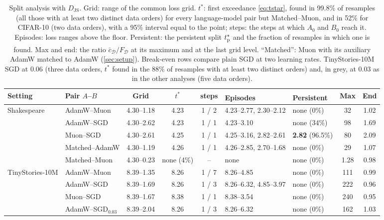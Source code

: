 \documentclass[10pt]{article}
\newcommand{\extra}{\textsuperscript{\dag}}  %
\newcommand{\JS}{\mathrm{JS}}
\newcommand{\cD}{\mathcal{D}}
\begin{document}
\begin{table}[t]
\centering\small
\caption{Split analysis with $D_\JS$. Grid: range of the common loss grid. $t^\ast$: first exceedance
\eqref{eq:tstar}, found in 99.8\% of resamples (all those with at least two distinct data orders)
for every language-model pair but Matched--Muon, and in 52\% for CIFAR-10 (two data orders), with a 95\% interval equal to the point;
steps: the steps at which $A_0$ and $B_0$ reach it. Episodes: loss ranges above the floor. Persistent: the
persistent split $t^\ast_{\rm p}$ and the fraction of resamples in which one is found. Max and end: the ratio
$\bar c_\cD/F_\cD$ at its maximum and at the last grid level. ``Matched''\extra: Muon with its auxiliary AdamW
matched to AdamW (\cref{sec:setup}). Break-even rows compare plain SGD at two learning rates. TinyStories-10M
SGD at 0.06 (three data orders, $t^\ast$ found in the 88\% of resamples with at least two distinct orders) and, in
grey, at 0.03 as in the other analyses (five data orders).}
\label{tab:tstar}
\setlength{\tabcolsep}{2.9pt}
\begin{tabular}{@{}llcccllcc@{}}
\toprule
Setting & Pair $A$--$B$ & Grid & $t^\ast$ & steps & Episodes\extra & Persistent\extra & Max & End \\
\midrule
Shakespeare & AdamW--Muon & 4.30--1.18 & 4.23 & 1 / 2 & 4.23--2.77, 2.30--2.12 & none (0\%) & 32 & 1.02 \\
            & AdamW--SGD  & 4.30--2.62 & 4.23 & 1 / 1 & 4.23--3.10 & none (34\%) & 98 & 1.69 \\
            & Muon--SGD   & 4.30--2.61 & 4.25 & 1 / 1 & 4.25--3.16, 2.82--2.61 & \textbf{2.82} (96.5\%) & 80 & 2.09 \\
            & Matched--AdamW & 4.30--1.19 & 4.26 & 1 / 1 & 4.26--2.85, 2.70--1.68 & none (0\%) & 29 & 1.07 \\
            & Matched--Muon & 4.30--0.23 & none (4\%) & -- & none & none (0\%) & 1.28 & 0.98 \\
TinyStories-10M & AdamW--Muon & 8.39--1.35 & 8.26 & 1 / 7 & 8.26--4.85 & none (0\%) & 111 & 0.99 \\
            & AdamW--SGD  & 8.39--1.69 & 8.26 & 1 / 3 & 8.26--6.32, 4.85--3.97 & none (0\%) & 222 & 0.96 \\
            & Muon--SGD   & 8.39--1.67 & 8.38 & 1 / 1 & 8.38--3.54 & none (0\%) & 240 & 0.95 \\
            & \color{gray}AdamW--SGD$_{0.03}$ & \color{gray}8.39--2.04 & \color{gray}8.26 & \color{gray}1 / 3 & \color{gray}8.26--6.32 & \color{gray}none (0\%) & \color{gray}162 & \color{gray}1.03 \\

\end{tabular}
\end{table}
\end{document}
